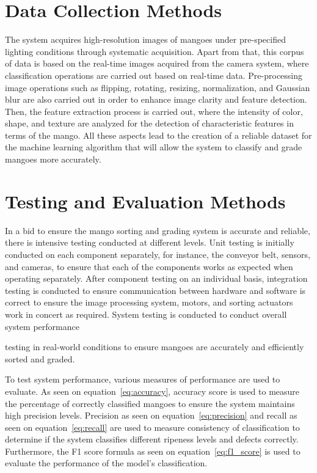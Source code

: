 \section{Data Collection Methods} \label{sec:dataset}
The system acquires high-resolution images of mangoes under pre-specified lighting conditions through systematic acquisition. Apart from that, this corpus of data is based on the real-time images acquired from the camera system, where classification operations are carried out based on real-time data. Pre-processing image operations such as flipping, rotating, resizing, normalization, and Gaussian blur are also carried out in order to enhance image clarity and feature detection. Then, the feature extraction process is carried out, where the intensity of color, shape, and texture are analyzed for the detection of characteristic features in terms of the mango. All these aspects lead to the creation of a reliable dataset for the machine learning algorithm that will allow the system to classify and grade mangoes more accurately.

\section{Testing and Evaluation Methods} \label{sec:trainandtest}
In a bid to ensure the mango sorting and grading system is accurate and reliable, there is 
intensive testing conducted at different levels. Unit testing is initially conducted 
on each component separately, for instance, the conveyor belt, sensors, and cameras, to ensure 
that each of the components works as expected when operating separately. After component testing 
on an individual basis, integration testing is conducted to ensure communication between hardware
 and software is correct to ensure the image processing system, motors, and sorting actuators work
  in concert as required. System testing is conducted to conduct overall system performance

testing in real-world conditions to ensure mangoes are accurately and efficiently sorted and graded.

To test system performance, various measures of performance are used to evaluate. 
As seen on equation~\ref{eq:accuracy}, \gls{accuracy score} is used to measure the percentage of 
correctly classified mangoes to ensure the system maintains high precision levels. 
\gls{Precision} as seen on equation~\ref{eq:precision} and \gls{recall} as seen on equation~\ref{eq:recall} 
are used to measure consistency of classification to determine if the system classifies different ripeness 
levels and defects correctly. Furthermore, the F1 score formula 
as seen on equation~\ref{eq:f1_score} is used to evaluate the performance of the model's classification. 

